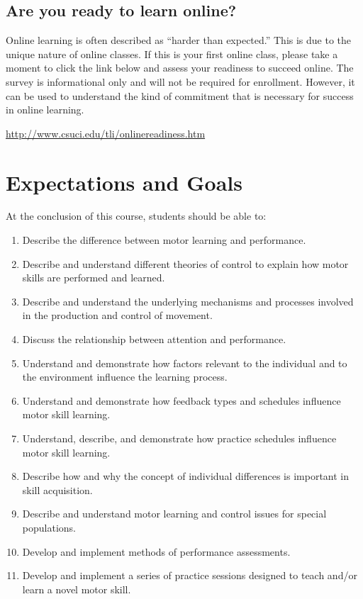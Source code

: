 \documentclass[11pt,]{article}
\providecommand{\tightlist}{%
  \setlength{\itemsep}{0pt}\setlength{\parskip}{0pt}}
\begin{document}
\hypertarget{are-you-ready-to-learn-online}{%
\subsection{Are you ready to learn
online?}\label{are-you-ready-to-learn-online}}

Online learning is often described as ``harder than expected.'' This is
due to the unique nature of online classes. If this is your first online
class, please take a moment to click the link below and assess your
readiness to succeed online. The survey is informational only and will
not be required for enrollment. However, it can be used to understand
the kind of commitment that is necessary for success in online learning.

\url{http://www.csuci.edu/tli/onlinereadiness.htm}

\hypertarget{expectations-and-goals}{%
\section{Expectations and Goals}\label{expectations-and-goals}}

At the conclusion of this course, students should be able to:

\begin{enumerate}
\def\labelenumi{\arabic{enumi}.}
\tightlist
\item
  Describe the difference between motor learning and performance.
\item
  Describe and understand different theories of control to explain how
  motor skills are performed and learned.
\item
  Describe and understand the underlying mechanisms and processes
  involved in the production and control of movement.
\item
  Discuss the relationship between attention and performance.
\item
  Understand and demonstrate how factors relevant to the individual and
  to the environment influence the learning process.
\item
  Understand and demonstrate how feedback types and schedules influence
  motor skill learning.
\item
  Understand, describe, and demonstrate how practice schedules influence
  motor skill learning.
\item
  Describe how and why the concept of individual differences is
  important in skill acquisition.
\item
  Describe and understand motor learning and control issues for special
  populations.
\item
  Develop and implement methods of performance assessments.
\item
  Develop and implement a series of practice sessions designed to teach
  and/or learn a novel motor skill.
\end{enumerate}
\end{document}
